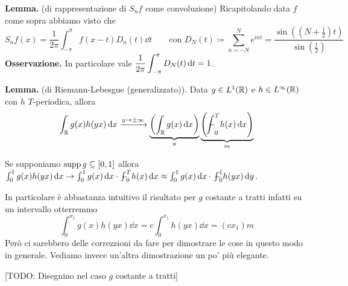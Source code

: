 %
%




\textbf{Lemma.} (di rappresentazione di $S_n f$ come convoluzione)
Ricapitolando data $f$ come sopra abbiamo visto che
$$
S_n f(x) = \frac{1}{2\pi} \int_{-\pi}^\pi f(x - t) D_n(t) \dd t
\qquad
\text{con }
D_N(t) \coloneqq \sum_{n=-N}^N e^{int} = \frac{\sin\left(\left(N + \frac{1}{2}\right)t\right)}{\sin \left(\frac{t}{2}\right)}
$$
\textbf{Osservazione.}
In particolare vale $\displaystyle \frac{1}{2\pi} \int_{-\pi}^\pi D_N(t) \,\mathrm{d} t = 1$.

\textbf{Lemma.} (di Riemann-Lebesgue (generalizzato)).
Data $g \in L^1(\mathbb R)$ e $h \in L^\infty(\mathbb R)$ con $h$ $T$-periodica, allora
$$
\int_\R g(x) h(yx) \dd x \xrightarrow{y \to \pm \infty}
\underbrace{\left(\int_\R g(x) \dd x \right)}_a
\underbrace{\left(\avint_0^T h(x) \dd x \right)}_m
$$

Se supponiamo $\operatorname{supp} g \subseteq [0, 1]$ allora $\int_0^1 g(x) h(yx) \dd x \to \int_0^1 g(x) \dd x \cdot \avint_0^T h(x) \dd x \approx \int_0^1 g(x) \dd x \cdot \avint_0^1 h(yx) \dd y$.

In particolare è abbastanza intuitivo il risultato per $g$ costante a tratti infatti su un intervallo otterremmo
$$
\int_0^{x_1} g(x) h(yx) \dd x = c \int_0^{x_1} h(yx) \dd x = (c x_1) m
$$
Però ci sarebbero delle correzzioni da fare per dimostrare le cose in questo modo in generale. Vediamo invece un'altra dimostrazione un po' più elegante.

[TODO: Disegnino nel caso $g$ costante a tratti]

